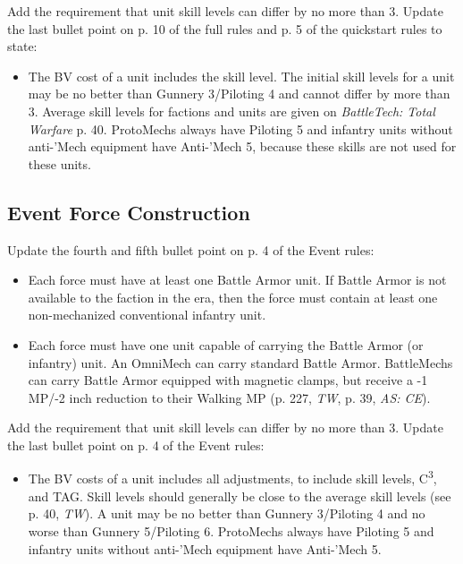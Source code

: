 Add the requirement that unit skill levels can differ by no more than 3.
Update the last bullet point on p. 10 of the full rules and p. 5 of the quickstart rules to state:

\begin{itemize}

\item The BV cost of a unit includes the skill level.
The initial skill levels for a unit may be no better than Gunnery 3/Piloting 4 and cannot differ by more than 3.
Average skill levels for factions and units are given on \emph{BattleTech: Total Warfare} p. 40.
ProtoMechs always have Piloting 5 and infantry units without anti-'Mech equipment have Anti-'Mech 5, because these skills are not used for these units.

\end{itemize}

\subsection{Event Force Construction}

Update the fourth and fifth bullet point on p. 4 of the Event rules:

\begin{itemize}

\item Each force must have at least one Battle Armor unit.
If Battle Armor is not available to the faction in the era, then the force must contain at least one non-mechanized conventional infantry unit.

\item Each force must have one unit capable of carrying the Battle Armor (or infantry) unit.
An OmniMech can carry standard Battle Armor.
BattleMechs can carry Battle Armor equipped with magnetic clamps, but receive a -1 MP/-2 inch reduction to their Walking MP (p. 227, \emph{TW}, p. 39, \emph{AS: CE}).

\end{itemize}

Add the requirement that unit skill levels can differ by no more than 3.
Update the last bullet point on p. 4 of the Event rules:

\begin{itemize}

\item The BV costs of a unit includes all adjustments, to include skill levels, C\textsuperscript{3}, and TAG.
Skill levels should generally be close to the average skill levels (see p. 40, \emph{TW}).
A unit may be no better than Gunnery 3/Piloting 4 and no worse than Gunnery 5/Piloting 6.
ProtoMechs always have Piloting 5 and infantry units without anti-'Mech equipment have Anti-'Mech 5.

\end{itemize}

